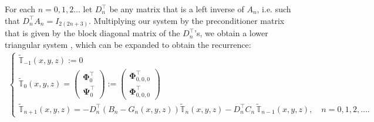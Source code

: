 \documentclass[11pt, oneside]{article}   	%
\newcommand{\Dnt}{D^\top_n}
\newcommand{\bigtsop}{\mathbb{T}}
\newcommand{\bigtsopt}{\tilde{\bigtsop}}
\newcommand{\bigtsoptn}{\bigtsopt_n}
\newcommand{\tsopi}{\bm{\Phi}}
\newcommand{\tsopii}{\bm{\Psi}}
\begin{document}
For each $n = 0,1,2\dots$ let $\Dnt$ be any matrix that is a left inverse of $A_n$, i.e. such that $\Dnt A_n = I_{2(2n+3)}$. Multiplying our system by the preconditioner matrix that is given by the block diagonal matrix of the $\Dnt$'s, we obtain a lower triangular system \cite[p78]{dunkl2014orthogonal}, which can be expanded to obtain the recurrence:
\begin{align*}
	\begin{cases}
		\bigtsopt_{-1}(x,y,z) := 0 \\
		\bigtsopt_{0}(x,y,z) = 
			\begin{pmatrix} 
				\tsopi_0^\top \\ 
				\tsopii_0^\top
			\end{pmatrix} :=
			\begin{pmatrix} 
				\tsopi_{0,0,0}^\top \\
				\tsopi_{0,0,0}^\top
			\end{pmatrix} \\
		\bigtsopt_{n+1}(x,y,z) = -\Dnt (B_n-G_n(x,y,z)) \bigtsoptn(x,y,z) - \Dnt C_n  \, \bigtsopt_{n-1}(x,y,z), \quad n = 0,1,2,\dots.
	\end{cases}
\end{align*}
\end{document}
